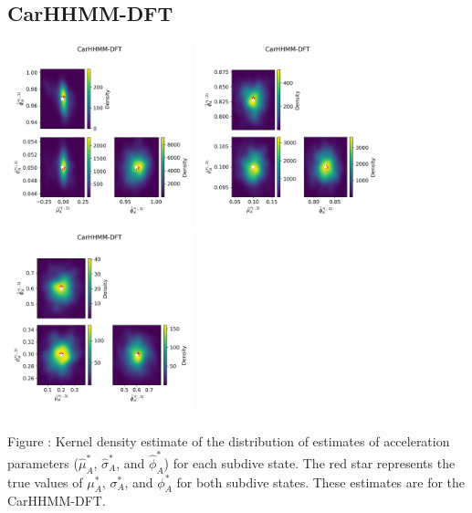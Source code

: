 \documentclass{article}
\begin{document}
        \subsection{CarHHMM-DFT}
        \begin{center}
        \includegraphics[width=2.1in]{../Plots/hhmm_FV_MLE_density_A_0_0.png}
        \includegraphics[width=2.1in]{../Plots/hhmm_FV_MLE_density_A_0_1.png}
        \includegraphics[width=2.1in]{../Plots/hhmm_FV_MLE_density_A_0_2.png}
        \end{center}
        
        \noindent Figure : Kernel density estimate of the distribution of estimates of acceleration parameters ($\hat \mu^*_A$, $\hat \sigma^*_A$, and $\hat \phi^*_A$) for each subdive state. The red star represents the true values of $\mu^*_A$, $\sigma^*_A$, and $\phi^*_A$ for both subdive states. These estimates are for the CarHHMM-DFT.
        \addtocounter{fignum}{1}
        
\end{document}
